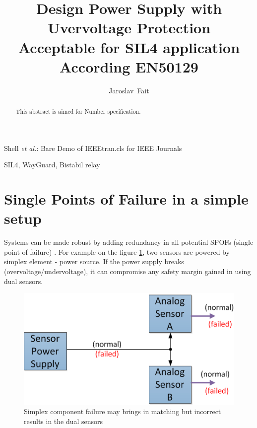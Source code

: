 \documentclass[journal]{IEEEtran}
\begin{document}
%
\title{Design Power Supply with Uvervoltage Protection \\
       Acceptable for SIL4  application According EN50129}

\author{Jaroslav~Fait} 

%
{Shell \MakeLowercase{\textit{et al.}}: Bare Demo of IEEEtran.cls for IEEE Journals}

\maketitle

\begin{abstract}
  This abstract is aimed for Number specification.
\end{abstract}

\begin{IEEEkeywords}
  SIL4, WayGuard, Bistabil relay
\end{IEEEkeywords}




%
\IEEEpeerreviewmaketitle


\section{Single Points of Failure in a simple setup}
  Systems can be made robust by adding redundancy in all potential SPOFs (single point of failure) 
  \cite{SPOF}. For example on the figure \ref{HW002:fig006}, two sensors are powered by simplex 
  element - power source. If the power supply breaks (overvoltage/undervoltage), it can compromise 
  any safety margin gained in using dual sensors. 
  
  \begin{figure}[!ht] %
    \centering
    \includegraphics[width=0.6\linewidth]{fig_HW006.png}
    \caption{Simplex component failure may brings in matching but incorrect results in the dual 
             sensors}
    \label{HW002:fig006}
  \end{figure}
  
\end{document}
